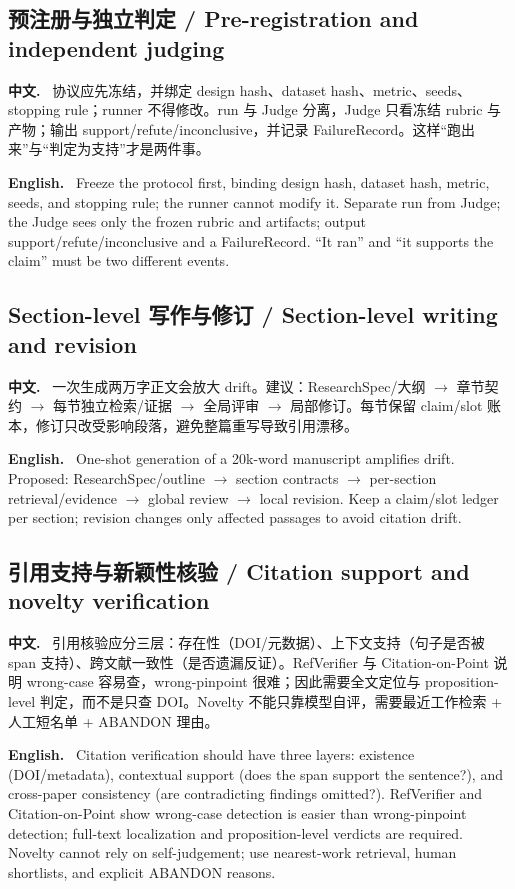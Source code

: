 \documentclass[UTF8,11pt]{ctexart}
\newcommand{\zh}{\par\noindent\textbf{中文.}\ }
\newcommand{\en}{\par\noindent\textbf{English.}\ }
\begin{document}
\subsection{预注册与独立判定 / Pre-registration and independent judging}
\zh
协议应先冻结，并绑定 design hash、dataset hash、metric、seeds、stopping rule；runner 不得修改。run 与 Judge 分离，Judge 只看冻结 rubric 与产物；输出 support/refute/inconclusive，并记录 FailureRecord。这样“跑出来”与“判定为支持”才是两件事。
\en
Freeze the protocol first, binding design hash, dataset hash, metric, seeds, and stopping rule; the runner cannot modify it. Separate run from Judge; the Judge sees only the frozen rubric and artifacts; output support/refute/inconclusive and a FailureRecord. ``It ran'' and ``it supports the claim'' must be two different events.

\subsection{Section-level 写作与修订 / Section-level writing and revision}
\zh
一次生成两万字正文会放大 drift。建议：ResearchSpec/大纲 $\rightarrow$ 章节契约 $\rightarrow$ 每节独立检索/证据 $\rightarrow$ 全局评审 $\rightarrow$ 局部修订。每节保留 claim/slot 账本，修订只改受影响段落，避免整篇重写导致引用漂移。
\en
One-shot generation of a 20k-word manuscript amplifies drift. Proposed: ResearchSpec/outline $\rightarrow$ section contracts $\rightarrow$ per-section retrieval/evidence $\rightarrow$ global review $\rightarrow$ local revision. Keep a claim/slot ledger per section; revision changes only affected passages to avoid citation drift.

\subsection{引用支持与新颖性核验 / Citation support and novelty verification}
\zh
引用核验应分三层：存在性（DOI/元数据）、上下文支持（句子是否被 span 支持）、跨文献一致性（是否遗漏反证）。RefVerifier 与 Citation-on-Point 说明 wrong-case 容易查，wrong-pinpoint 很难；因此需要全文定位与 proposition-level 判定，而不是只查 DOI。Novelty 不能只靠模型自评，需要最近工作检索 + 人工短名单 + ABANDON 理由。
\en
Citation verification should have three layers: existence (DOI/metadata), contextual support (does the span support the sentence?), and cross-paper consistency (are contradicting findings omitted?). RefVerifier and Citation-on-Point show wrong-case detection is easier than wrong-pinpoint detection; full-text localization and proposition-level verdicts are required. Novelty cannot rely on self-judgement; use nearest-work retrieval, human shortlists, and explicit ABANDON reasons.
\end{document}
